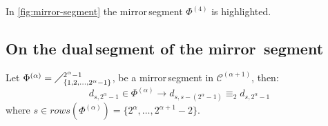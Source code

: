 
In \autoref{fig:mirror-segment} the \flqq mirror\frqq\,segment $\Phi^{(4)}$ is highlighted.

\subsection{On the \flqq dual\frqq\,segment of the \flqq mirror\frqq\, segment}

\begin{theorem}
    Let  
    $\Phi^{(\alpha)}=\diagup_{\lbrace 1,2,\ldots,2^{\alpha}-1\rbrace}^{2^{\alpha}-1}$, 
    be a \flqq mirror\frqq\,segment in $\mathcal{C}^{(\alpha+1)}$, then: 
    \begin{equation}
        d_{s,2^{\alpha}-1}\in\Phi^{(\alpha)}\rightarrow d_{s,s-(2^{\alpha}-1)}\equiv_{2}d_{s,2^{\alpha}-1}
    \end{equation}
    where $s\in rows\left(\Phi^{(\alpha)}\right)=\lbrace2^{\alpha},\ldots,2^{\alpha+1}-2\rbrace$.
\end{theorem}

